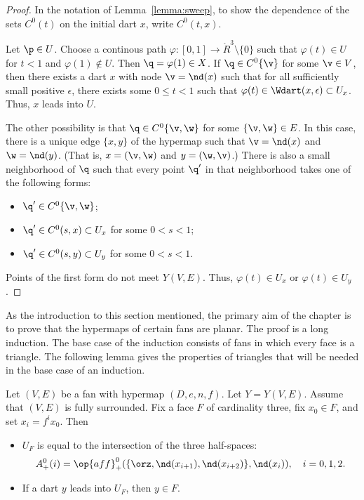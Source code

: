 \begin{proof}  
In the notation of Lemma~\ref{lemma:sweep}, to show the dependence
of the sets $C^0(t)$ on the initial dart $x$, write $C^0(t,x)$.

Let $\p\in U$.  Choose a continous path $\varphi:[0,1]\to
\ring{R}^3\setminus\{0\}$ such that $\varphi(t)\in U$ for $t<1$ and
$\varphi(1)\not\in U$.  Then $\q=\varphi(1)\in X$.  If $\q\in
C^0\{\v\}$ for some $\v\in V$, then there exists a dart $x$ with
node $\v = \nd(x)$ such that for all sufficiently small positive
$\epsilon$, there exists some $0\le t < 1$ such that $\varphi(t)\in
\Wdart(x,\epsilon)\subset U_x$.  Thus, $x$ leads into $U$.
%

The other possibility is that $\q\in C^0\{\v,\w\}$ for some
$\{\v,\w\}\in E$.  In this case, there is a unique edge $\{x,y\}$ of
the hypermap such that $\v=\nd(x)$ and $\w=\nd(y)$.  (That is,
$x=(\v,\w)$ and $y=(\w,\v)$.)  There is also a small neighborhood of
$\q$ such that every point $\q'$ in that neighborhood takes one of
the following forms:
\begin{itemize} \item $\q'\in C^0\{\v,\w\}$;
\item $\q'\in C^0(s,x)\subset U_x$ for some $0<s<1$;
\item $\q'\in C^0(s,y)\subset U_y$ for some $0<s<1$.
\end{itemize}
Points of the first form do not meet $Y(V,E)$.  Thus, $\varphi(t)\in U_x$
or $\varphi(t)\in U_y$.
\end{proof}

As the introduction to this section mentioned, the primary aim of the chapter
is to prove that the hypermaps of certain fans are planar.  The proof is a long
induction.  The base case of the induction consists of fans in which every face
is a triangle.  The following lemma gives the properties of triangles that will be
needed in the base case of an induction.

\begin{lemma} \label{lemma:triangle}
Let $(V,E)$ be a fan with hypermap $(D,e,n,f)$.  Let $Y=Y(V,E)$.
Assume that $(V,E)$ is fully surrounded. Fix a face $F$ of
cardinality three, fix $x_0\in F$, and set $x_i = f^i x_0$. Then
%
\begin{itemize}  
\item $U_F$ is equal to the intersection of the three half-spaces:
\begin{displaymath}A^0_+(i)=\op{aff}_+^0(\{\orz,\nd(x_{i+1}),\nd(x_{i+2})\},\nd(x_i)),\quad
i=0,1,2.\end{displaymath}
\item If a dart $y$ leads into $U_F$, then $y\in F$.
\end{itemize}
\end{lemma}
%

